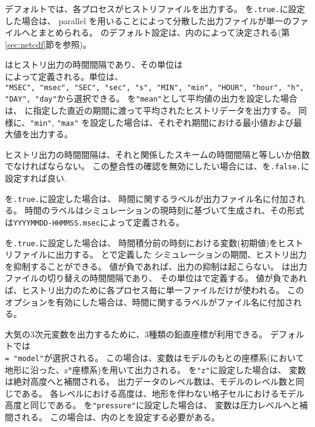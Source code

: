 デフォルトでは、各プロセスがヒストリファイルを出力する。
を\verb|.true.|に設定した場合は、
 parallel \Netcdf を用いることによって分散した出力ファイルが単一のファイルへとまとめられる。
のデフォルト設定は、内のによって決定される(第\ref{sec:netcdf}節を参照)。

はヒストリ出力の時間間隔であり、その単位は\\
によって定義される。単位は、\\
\verb|"MSEC", "msec", "SEC", "sec", "s", "MIN", "min", "HOUR", "hour", "h", "DAY", "day"|から選択できる。
%
を\verb|"mean"|として平均値の出力を設定した場合は、
に指定した直近の期間に渡って平均されたヒストリデータを出力する。
同様に、\verb|"min"|, \verb|"max"| を設定した場合は、それぞれ期間における最小値および最大値を出力する。

ヒストリ出力の時間間隔は、それと関係したスキームの時間間隔と等しいか倍数でなければならない。
この整合性の確認を無効にしたい場合には、を\verb|.false.|に設定すれば良い.

を\verb|.true.|に設定した場合は、
時間に関するラベルが出力ファイル名に付加される。
時間のラベルはシミュレーションの現時刻に基づいて生成され、その形式は\verb|YYYYMMDD-HHMMSS.msec|によって定義される。

を\verb|.true.|に設定した場合は、
時間積分前の時刻における変数(初期値)をヒストリファイルに出力する。
とで定義した
シミュレーションの期間、ヒストリ出力を抑制することができる。
値が負であれば、出力の抑制は起こらない。
は出力ファイルの切り替えの時間間隔であり、
その単位はで定義する。
値が負であれば、ヒストリ出力のために各プロセス毎に単一ファイルだけが使われる。
このオプションを有効にした場合は、時間に関するラベルがファイル名に付加される。

大気の3次元変数を出力するために、3種類の鉛直座標が利用できる。
デフォルトでは\\
 \verb|= "model"|が選択される。
この場合は、変数はモデルのもとの座標系({\scalerm}において地形に沿った、z*座標系)を用いて出力される。
を\verb|"z"|に設定した場合は、 変数は絶対高度へと補間される。
出力データのレベル数は、モデルのレベル数と同じである。
各レベルにおける高度は、地形を伴わない格子セルにおけるモデル高度と同じである。
を\verb|"pressure"|に設定した場合は、
変数は圧力レベルへと補間される。
この場合は、内のとを設定する必要がある。

